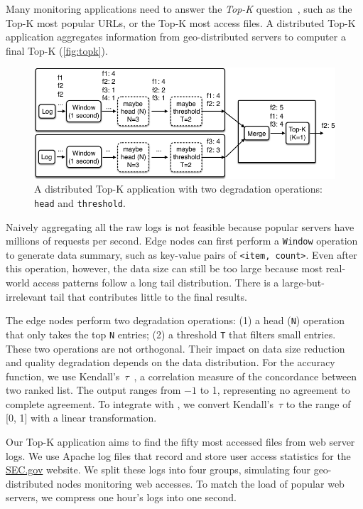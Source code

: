  Many monitoring applications need to answer the
\textit{Top-K} question~\cite{babcock2003distributed}, such as the Top-K most
popular URLs, or the Top-K most access files. A distributed Top-K application
aggregates information from geo-distributed servers to computer a final Top-K
(\autoref{fig:topk}).

\begin{figure}
  \centering
  \includegraphics[width=\columnwidth]{figures/topk.pdf}
  \caption{A distributed Top-K application with two degradation operations:
    \texttt{head} and \texttt{threshold}.}
  \label{fig:topk}
\end{figure}

Naively aggregating all the raw logs is not feasible because popular servers
have millions of requests per second. Edge nodes can first perform a
\texttt{Window} operation to generate data summary, such as key-value pairs of
\texttt{<item, count>}. Even after this operation, however, the data size can
still be too large because most real-world access patterns follow a long tail
distribution. There is a large-but-irrelevant tail that contributes little to
the final results.

The edge nodes perform two degradation operations: (1) a head (\texttt{N})
operation that only takes the top \texttt{N} entries; (2) a threshold \texttt{T}
that filters small entries. These two operations are not orthogonal. Their
impact on data size reduction and quality degradation depends on the data
distribution. For the accuracy function, we use
Kendall's~$\tau$~\cite{abdi2007kendall}, a correlation measure of the
concordance between two ranked list. The output ranges from \(-1\) to 1,
representing no agreement to complete agreement. To integrate with \sysname{},
we convert Kendall's~$\tau$ to the range of [0, 1] with a linear transformation.

Our Top-K application aims to find the fifty most accessed files from web server
logs. We use Apache log files that record and store user access statistics for
the \href{https://www.sec.gov}{SEC.gov} website. We split these logs into four
groups, simulating four geo-distributed nodes monitoring web accesses.  To match
the load of popular web servers, we compress one hour's logs into one second.

